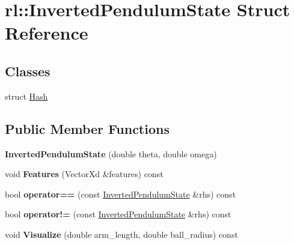 \hypertarget{structrl_1_1_inverted_pendulum_state}{}\section{rl\+:\+:Inverted\+Pendulum\+State Struct Reference}
\label{structrl_1_1_inverted_pendulum_state}
\subsection*{Classes}
\begin{DoxyCompactItemize}
\item 
struct \hyperlink{structrl_1_1_inverted_pendulum_state_1_1_hash}{Hash}
\end{DoxyCompactItemize}
\subsection*{Public Member Functions}
\begin{DoxyCompactItemize}
\item 
\hypertarget{structrl_1_1_inverted_pendulum_state_ab292ae27975cdb8a937d7c3db89a74b0}{}\label{structrl_1_1_inverted_pendulum_state_ab292ae27975cdb8a937d7c3db89a74b0} 
{\bfseries Inverted\+Pendulum\+State} (double theta, double omega)
\item 
\hypertarget{structrl_1_1_inverted_pendulum_state_a3be4d94d9124b5f87b3d1bd7f1358eac}{}\label{structrl_1_1_inverted_pendulum_state_a3be4d94d9124b5f87b3d1bd7f1358eac} 
void {\bfseries Features} (Vector\+Xd \&features) const
\item 
\hypertarget{structrl_1_1_inverted_pendulum_state_a4ed1355b6ca708fcfe309d056d751f17}{}\label{structrl_1_1_inverted_pendulum_state_a4ed1355b6ca708fcfe309d056d751f17} 
bool {\bfseries operator==} (const \hyperlink{structrl_1_1_inverted_pendulum_state}{Inverted\+Pendulum\+State} \&rhs) const
\item 
\hypertarget{structrl_1_1_inverted_pendulum_state_a0f36d282ec56ffcb956984523b8542e2}{}\label{structrl_1_1_inverted_pendulum_state_a0f36d282ec56ffcb956984523b8542e2} 
bool {\bfseries operator!=} (const \hyperlink{structrl_1_1_inverted_pendulum_state}{Inverted\+Pendulum\+State} \&rhs) const
\item 
\hypertarget{structrl_1_1_inverted_pendulum_state_aa03d392fce7011b917b4dad0d9260837}{}\label{structrl_1_1_inverted_pendulum_state_aa03d392fce7011b917b4dad0d9260837} 
void {\bfseries Visualize} (double arm\+\_\+length, double ball\+\_\+radius) const
\end{DoxyCompactItemize}
